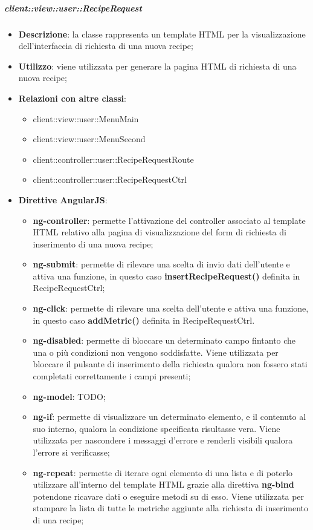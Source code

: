 		\subparagraph{client::view::user::RecipeRequest} %
		\label{subp:bdsm_app_client_view_user_reciperequest}
			\begin{itemize}
				\item \textbf{Descrizione}: la classe rappresenta un template HTML per la visualizzazione dell'interfaccia di richiesta di una nuova recipe;
				\item \textbf{Utilizzo}: viene utilizzata per generare la pagina HTML di richiesta di una nuova recipe;
				\item \textbf{Relazioni con altre classi}:
					\begin{itemize}
						\item client::view::user::MenuMain
						\item client::view::user::MenuSecond
						\item client::controller::user::RecipeRequestRoute
						\item client::controller::user::RecipeRequestCtrl
					\end{itemize}
				\item \textbf{Direttive AngularJS}:
					\begin{itemize}
						\item \textbf{ng-controller}: permette l'attivazione del controller associato al template HTML relativo alla pagina di visualizzazione del form di richiesta di inserimento di una nuova recipe;
						\item \textbf{ng-submit}: permette di rilevare una scelta di invio dati dell'utente e attiva una funzione, in questo caso \textbf{insertRecipeRequest()} definita in RecipeRequestCtrl;
						\item \textbf{ng-click}: permette di rilevare una scelta dell'utente e attiva una funzione, in questo caso \textbf{addMetric()} definita in RecipeRequestCtrl.
						\item \textbf{ng-disabled}: permette di bloccare un determinato campo fintanto che una o più condizioni non vengono soddisfatte. Viene utilizzata per bloccare il pulsante di inserimento della richiesta qualora non fossero stati completati correttamente i campi presenti;
						\item \textbf{ng-model}: TODO;
						\item \textbf{ng-if}: permette di visualizzare un determinato elemento, e il contenuto al suo interno, qualora la condizione specificata risultasse vera. Viene utilizzata per nascondere i messaggi d'errore e renderli visibili qualora l'errore si verificasse;
						\item \textbf{ng-repeat}: permette di iterare ogni elemento di una lista e di poterlo utilizzare all'interno del template HTML grazie alla direttiva \textbf{ng-bind} potendone ricavare dati o eseguire metodi su di esso. Viene utilizzata per stampare la lista di tutte le metriche aggiunte alla richiesta di inserimento di una recipe;

\end{itemize}
\end{itemize}
